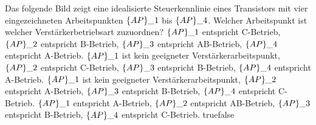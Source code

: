     {Das folgende Bild zeigt eine idealisierte Steuerkennlinie eines Transistors mit vier eingezeichneten Arbeitspunkten $\text\{AP\}\_1$ bis $\text\{AP\}\_4$.  Welcher Arbeitspunkt ist welcher Verstärkerbetriebsart zuzuordnen?}
    {$\text\{AP\}\_1$ entspricht C-Betrieb, $\text\{AP\}\_2$ entspricht B-Betrieb, $\text\{AP\}\_3$ entspricht AB-Betrieb, $\text\{AP\}\_4$ entspricht A-Betrieb.}
    {$\text\{AP\}\_1$ ist kein geeigneter Verstärkerarbeitspunkt, $\text\{AP\}\_2$ entspricht C-Betrieb, $\text\{AP\}\_3$ entspricht B-Betrieb, $\text\{AP\}\_4$ entspricht A-Betrieb.}
    {$\text\{AP\}\_1$ ist kein geeigneter Verstärkerarbeitspunkt, $\text\{AP\}\_2$ entspricht A-Betrieb, $\text\{AP\}\_3$ entspricht B-Betrieb, $\text\{AP\}\_4$ entspricht C-Betrieb.}
    {$\text\{AP\}\_1$ entspricht A-Betrieb, $\text\{AP\}\_2$ entspricht AB-Betrieb, $\text\{AP\}\_3$ entspricht B-Betrieb, $\text\{AP\}\_4$ entspricht C-Betrieb.}
    {true}{false}